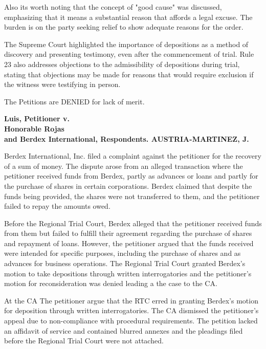 \documentclass[
12pt,
oneside,
onehalfspacing,
headsepline
]{DigestCollection}
\begin{document}
Also its worth noting that the concept of "good cause" was discussed, emphasizing that it means a substantial reason that affords a legal excuse. The burden is on the party seeking relief to show adequate reasons for the order.

The Supreme Court highlighted the importance of depositions as a method of discovery and presenting testimony, even after the commencement of trial. Rule 23 also addresses objections to the admissibility of depositions during trial, stating that objections may be made for reasons that would require exclusion if the witness were testifying in person.

The Petitions are DENIED for lack of merit.

\label{0e59dee0-0a10-11ef-932c-63c852f65e48}


\noindent\textbf{Luis, Petitioner v. \\Honorable Rojas \\and Berdex International, Respondents. AUSTRIA-MARTINEZ, J.}\vspace{0.4cm}

Berdex International, Inc. filed a complaint against the petitioner for the recovery of a sum of money. The dispute arose from an alleged transaction where the petitioner received funds from Berdex, partly as advances or loans and partly for the purchase of shares in certain corporations. Berdex claimed that despite the funds being provided, the shares were not transferred to them, and the petitioner failed to repay the amounts owed.

Before the Regional Trial Court, Berdex alleged that the petitioner received funds from them but failed to fulfill their agreement regarding the purchase of shares and repayment of loans. However, the petitioner argued that the funds received were intended for specific purposes, including the purchase of shares and as advances for business operations. The Regional Trial Court granted Berdex's motion to take depositions through written interrogatories and the petitioner's motion for reconsideration was denied leading a the case to the CA.

At the CA The petitioner argue that the RTC erred in granting Berdex's motion for deposition through written interrogatories. The CA dismissed the petitioner's appeal due to non-compliance with procedural requirements. The petition lacked an affidavit of service and contained blurred annexes and the pleadings filed before the Regional Trial Court were not attached.
\end{document}
